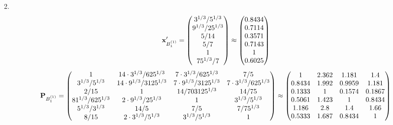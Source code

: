 \documentclass[10pt,a4paper]{article}
\begin{document}
	2.
	\[
		\bold{x}'_{B_1^{(1)}} = 
		\begin{pmatrix}
			{{3^ {1 / 3}}} / {{5^ {1 / 3}}} \\
			{{9^ {1 / 3}}} / {{25^ {1 / 3}}} \\
			{{5}} / {{14}} \\
			{{5}} / {{7}} \\
			{1}{} \\
			{{75^ {1 / 3}}} / {{7}} \\
		\end{pmatrix}
		\approx
		\begin{pmatrix}
			0.8434   \\
			0.7114   \\
			0.3571   \\
			0.7143   \\
			1        \\
			0.6025   \\
		\end{pmatrix}
	\]
	\[
		\bold{P}_{B_1^{(1)}} = 
		\begin{pmatrix}
			{1}{} & {{14} \cdot {3^ {1 / 3}}} / {{625^ {1 / 3}}} & {{7} \cdot {3^ {1 / 3}}} / {{625^ {1 / 3}}} & {{7}} / {{5}} \\
			{{3^ {1 / 3}}} / {{5^ {1 / 3}}} & {{14} \cdot {9^ {1 / 3}}} / {{3125^ {1 / 3}}} & {{7} \cdot {9^ {1 / 3}}} / {{3125^ {1 / 3}}} & {{7} \cdot {3^ {1 / 3}}} / {{625^ {1 / 3}}} \\
			{{2}} / {{15}} & {1}{} & {{14}} / {{703125^ {1 / 3}}} & {{14}} / {{75}} \\
			{{81^ {1 / 3}}} / {{625^ {1 / 3}}} & {{2} \cdot {9^ {1 / 3}}} / {{25^ {1 / 3}}} & {1}{} & {{3^ {1 / 3}}} / {{5^ {1 / 3}}} \\
			{{5^ {1 / 3}}} / {{3^ {1 / 3}}} & {{14}} / {{5}} & {{7}} / {{5}} & {{7}} / {{75^ {1 / 3}}} \\
			{{8}} / {{15}} & {{2} \cdot {3^ {1 / 3}}} / {{5^ {1 / 3}}} & {{3^ {1 / 3}}} / {{5^ {1 / 3}}} & {1}{} \\
		\end{pmatrix}
		\approx
		\begin{pmatrix}
			1        & 2.362    & 1.181    & 1.4      \\
			0.8434   & 1.992    & 0.9959   & 1.181    \\
			0.1333   & 1        & 0.1574   & 0.1867   \\
			0.5061   & 1.423    & 1        & 0.8434   \\
			1.186    & 2.8      & 1.4      & 1.66     \\
			0.5333   & 1.687    & 0.8434   & 1        \\
		\end{pmatrix}
	\]
\end{document}
